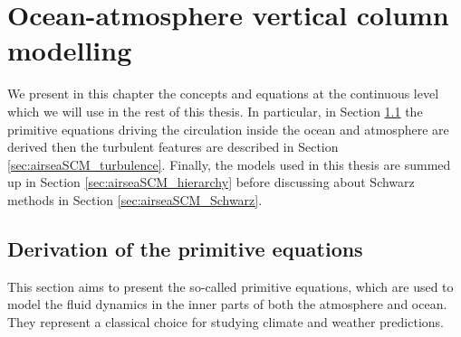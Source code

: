 \chapter{Ocean-atmosphere vertical column modelling}
\label{ch:airseaSCM}
\minitoc
We present in this chapter the concepts and equations at
the continuous level which
we will use in the rest of this thesis.
In particular, in Section \ref{sec:airseaSCM_primitiveEquations}
the primitive equations driving the circulation inside
the ocean and atmosphere are derived then
the turbulent features are described in Section
\ref{sec:airseaSCM_turbulence}.
Finally, the models used in this thesis are summed up
in Section \ref{sec:airseaSCM_hierarchy}
before discussing about Schwarz methods in Section
\ref{sec:airseaSCM_Schwarz}.
\section{Derivation of the primitive equations}
\label{sec:airseaSCM_primitiveEquations}
This section aims to present the so-called
primitive equations, which are used to model the fluid dynamics
in the inner parts of both the atmosphere and ocean. They represent
a classical choice for studying climate and weather predictions.
